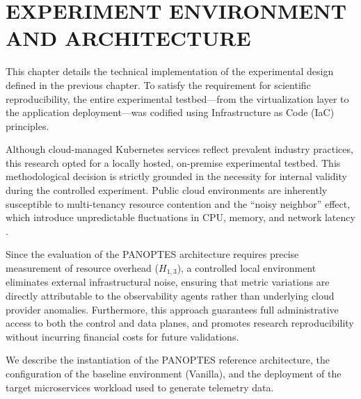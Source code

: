 \chapter{EXPERIMENT ENVIRONMENT AND ARCHITECTURE}
\label{chap:experiment-implementation}

This chapter details the technical implementation of the experimental design defined in the previous chapter. To satisfy the requirement for scientific reproducibility, the entire experimental testbed---from the virtualization layer to the application deployment---was codified using Infrastructure as Code (IaC) principles.

Although cloud-managed Kubernetes services reflect prevalent industry practices, this research opted for a locally hosted, on-premise experimental testbed. This methodological decision is strictly grounded in the necessity for internal validity during the controlled experiment. Public cloud environments are inherently susceptible to multi-tenancy resource contention and the ``noisy neighbor'' effect, which introduce unpredictable fluctuations in CPU, memory, and network latency \cite{kuria_2024}.

Since the evaluation of the PANOPTES architecture requires precise measurement of resource overhead ($H_{1,3}$), a controlled local environment eliminates external infrastructural noise, ensuring that metric variations are directly attributable to the observability agents rather than underlying cloud provider anomalies. Furthermore, this approach guarantees full administrative access to both the control and data planes, and promotes research reproducibility without incurring financial costs for future validations.

We describe the instantiation of the PANOPTES reference architecture, the configuration of the baseline environment (Vanilla), and the deployment of the target microservices workload used to generate telemetry data.















